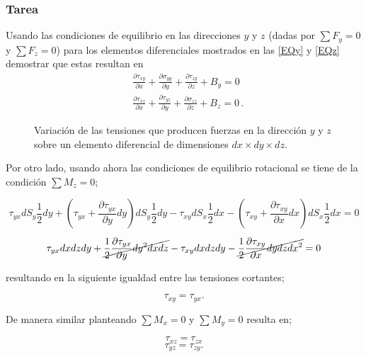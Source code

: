 \documentclass[../notas medios.tex]{subfiles}
\begin{document}
\subsubsection{Tarea}
Usando las condiciones de equilibrio en las direcciones $y$ y $z$ (dadas por $\sum {{F_y} = 0}$ y $\sum {{F_z} = 0}$) para los elementos diferenciales mostrados en las \cref{EQy} y \cref{EQz} demostrar que estas resultan en
\begin{align*}
&\frac{{\partial {\tau _{xy}}}}{{\partial x}} + \frac{{\partial {\sigma _{yy}}}}{{\partial y}} + \frac{{\partial {\tau _{zy}}}}{{\partial z}} + {B_y} = 0\\
&\frac{{\partial {\tau _{xz}}}}{{\partial x}} + \frac{{\partial {\tau _{yz}}}}{{\partial y}} + \frac{{\partial {\sigma _{zz}}}}{{\partial z}} + {B_z} = 0\, .
\end{align*}


\begin{figure}[H]
     \centering
     \hspace{0.5cm}
     \caption{Variación de las tensiones que producen fuerzas en la dirección $y$ y $z$ sobre un elemento diferencial de dimensiones $dx \times dy \times dz$.}
     \label{steady_state}
\end{figure}


Por otro lado, usando ahora las condiciones de equilibrio rotacional se tiene de la condición $\sum {{M_z} = 0}$;

\[{\tau _{yx}}d{S_y}\frac{1}{2}dy + \left( {{\tau _{yx}} + \frac{{\partial {\tau _{yx}}}}{{\partial y}}dy} \right)d{S_y}\frac{1}{2}dy - {\tau _{xy}}d{S_x}\frac{1}{2}dx - \left( {{\tau _{xy}} + \frac{{\partial {\tau _{xy}}}}{{\partial x}}dx} \right)d{S_x}\frac{1}{2}dx = 0\]

\[{\tau _{yx}}dxdzdy + \cancel{\frac{1}{2}\frac{{\partial {\tau _{yx}}}}{{\partial y}}d{y^2}dxdz} - {\tau _{xy}}dxdzdy - \cancel{\frac{1}{2}\frac{{\partial {\tau _{xy}}}}{{\partial x}}dydzd{x^2}} = 0\]

resultando en la siguiente igualdad entre las tensiones cortantes;

\[{\tau _{xy}} = {\tau _{yx}}.\]

De manera similar planteando $\sum {{M_x} = 0}$ y $\sum {{M_y} = 0}$ resulta en;

\[{\tau _{xz}} = {\tau _{zx}}\]
\[{\tau _{yz}} = {\tau _{zy}}.\]
\end{document}
